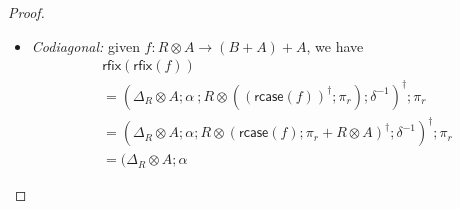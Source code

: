 \documentclass[acmsmall,screen,review]{acmart}
\newcommand{\ms}[1]{\ensuremath{\mathsf{#1}}}
\newcommand{\dmor}[1]{{\Delta}_{#1}}
\newcommand{\rcase}[1]{\ms{rcase}(#1)}
\newcommand{\rfix}[1]{\ms{rfix}(#1)}
\newcommand{\rseq}[3]{#2 \gg_{#1} #3}
\begin{document}
\begin{proof}
\begin{itemize}
    \begin{equation}
      \begin{aligned}
        \rseq{}{\rfix{f}}{g} 
        & = \dmor{R} \otimes A ; \alpha ; R \otimes (\rcase{f} ; \pi_r + R \otimes A)^\dagger ; g \\
        & = \dmor{R} \otimes A ; \alpha 
          ; (R \otimes (\rcase{f} ; \pi_r + R \otimes A) ; \delta^{-1})^\dagger ; g \\
        & = \dmor{R} \otimes A ; \alpha 
          ; (R \otimes 
            (\dmor{R} \otimes A ; \alpha ; R \otimes f ; \delta^{-1} ; \pi_r + R \otimes A) 
            ; \delta^{-1})^\dagger ; g \\
        & = \dmor{R} \otimes A ; \alpha 
          ; (R \otimes 
            (\dmor{R} \otimes A ; \alpha ; R \otimes f ; \delta^{-1}) 
            ; \delta^{-1} ; R \otimes \pi_r + R \otimes (R \otimes A))^\dagger ; g
      \end{aligned}
    \end{equation}
    By uniformity, it hence suffices to show that
    \begin{equation}
      \begin{aligned}
        & (\dmor{R} \otimes A ; \alpha)
          ; (R \otimes 
          (\dmor{R} \otimes A ; \alpha ; R \otimes f ; \delta^{-1}) 
          ; \delta^{-1} ; R \otimes \pi_r + R \otimes (R \otimes A)) \\
        & = \dmor{R} \otimes A ; \alpha ; R \otimes f ; \delta^{-1}
          ; (\dmor{R} \otimes B ; \alpha ; R \otimes \pi_r)
          + (\dmor{R} \otimes A ; \alpha) \\
        & = \rcase{f} ; (R \otimes B) + (\dmor{R} \otimes A ; \alpha)
      \end{aligned}
    \end{equation}
    to yield the desired result.
    \item \emph{Codiagonal:} given $f : R \otimes A \to (B + A) + A$, we have
    \begin{equation}
      \begin{aligned}
        & \rfix{\rfix{f}} \\
        & = (\dmor{R} \otimes A ; \alpha \
            ; R \otimes ((\rcase{f})^\dagger ; \pi_r) ; \delta^{-1})^\dagger 
          ; \pi_r \\
        & = (\dmor{R} \otimes A ; \alpha 
            ; R \otimes (\rcase{f} ; \pi_r + R \otimes A)^\dagger
            ; \delta^{-1})^\dagger 
          ; \pi_r \\
        & = (\dmor{R} \otimes A ; \alpha 

\end{aligned}
\end{equation}
\end{itemize}
\end{proof}
\end{document}
